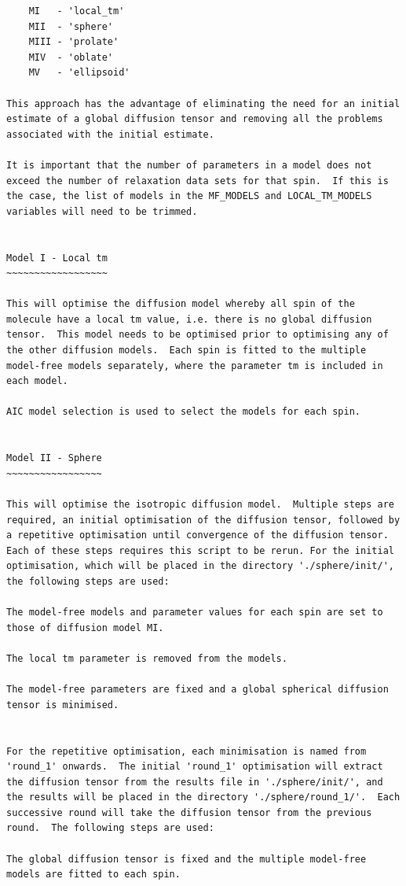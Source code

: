 \begin{htmlonly}
\begin{htmlonly}
\begin{lstlisting}
    MI   - 'local_tm'
    MII  - 'sphere'
    MIII - 'prolate'
    MIV  - 'oblate'
    MV   - 'ellipsoid'

This approach has the advantage of eliminating the need for an initial estimate of a global diffusion tensor and removing all the problems associated with the initial estimate.

It is important that the number of parameters in a model does not exceed the number of relaxation data sets for that spin.  If this is the case, the list of models in the MF_MODELS and LOCAL_TM_MODELS variables will need to be trimmed.


Model I - Local tm
~~~~~~~~~~~~~~~~~~

This will optimise the diffusion model whereby all spin of the molecule have a local tm value, i.e. there is no global diffusion tensor.  This model needs to be optimised prior to optimising any of the other diffusion models.  Each spin is fitted to the multiple model-free models separately, where the parameter tm is included in each model.

AIC model selection is used to select the models for each spin.


Model II - Sphere
~~~~~~~~~~~~~~~~~

This will optimise the isotropic diffusion model.  Multiple steps are required, an initial optimisation of the diffusion tensor, followed by a repetitive optimisation until convergence of the diffusion tensor.  Each of these steps requires this script to be rerun. For the initial optimisation, which will be placed in the directory './sphere/init/', the following steps are used:

The model-free models and parameter values for each spin are set to those of diffusion model MI.

The local tm parameter is removed from the models.

The model-free parameters are fixed and a global spherical diffusion tensor is minimised.


For the repetitive optimisation, each minimisation is named from 'round_1' onwards.  The initial 'round_1' optimisation will extract the diffusion tensor from the results file in './sphere/init/', and the results will be placed in the directory './sphere/round_1/'.  Each successive round will take the diffusion tensor from the previous round.  The following steps are used:

The global diffusion tensor is fixed and the multiple model-free models are fitted to each spin.


\end{lstlisting}
\end{htmlonly}
\end{htmlonly}

